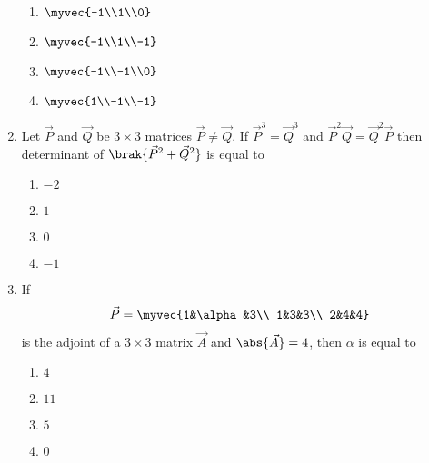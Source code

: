\begin{enumerate}
	\hfill{}
\begin{multicols}{4}
        \begin{enumerate}
	    	\item $ \myvec{-1\\1\\0} $ 
		\item $ \myvec{-1\\1\\-1} $ 
		\item $ \myvec{-1\\-1\\0} $
		\item $ \myvec{1\\-1\\-1} $ 
        \end{enumerate}
\end{multicols}
%
	\item Let $\vec{P}$ and $\vec{Q}$ be $3\times3$ matrices $\vec{P}\neq \vec{Q}$. If $\vec{P}^3=\vec{Q}^3$ and $\vec{P}^2\vec{Q}=\vec{Q}^2\vec{P}$ then determinant of $\brak{\vec{P}^2+\vec{Q}^2}$ is equal to
	\hfill{}
\begin{multicols}{4}
        \begin{enumerate}
                \item $-2$
                \item $1$
                \item $0$
                \item $-1$
        \end{enumerate}
\end{multicols}
%
	\item If \begin{align*}
		\vec{P} = \myvec{1&\alpha&3\\
		1&3&3\\
		2&4&4}
	\end{align*} is the adjoint of a $3\times3$ matrix $\vec{A}$ and $\abs{\vec{A}} = 4$, then $\alpha$ is equal to
	\hfill{}
\begin{multicols}{4}
        \begin{enumerate}
                \item $4$
                \item $11$
                \item $5$
                \item $0$
        \end{enumerate}
\end{multicols}

\end{enumerate}
